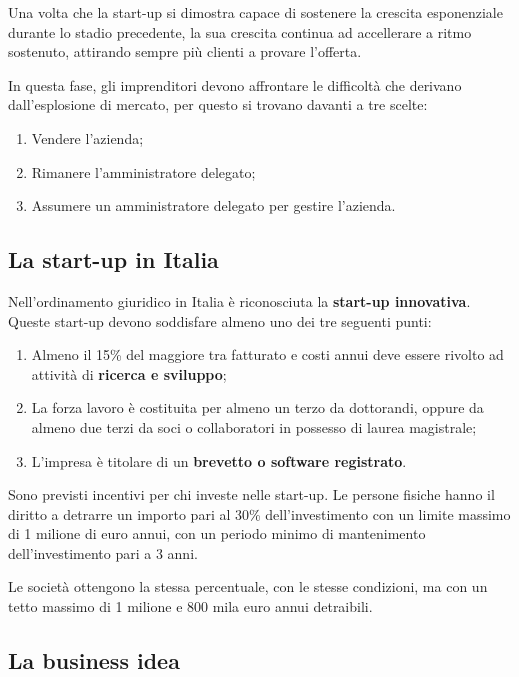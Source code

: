 \documentclass[14pt]{extarticle}
\begin{document}
Una volta che la start-up si dimostra capace di sostenere la crescita
esponenziale durante lo stadio precedente, la sua crescita continua ad
accellerare a ritmo sostenuto, attirando sempre più clienti a provare l'offerta.

In questa fase, gli imprenditori devono affrontare le difficoltà che derivano
dall'esplosione di mercato, per questo si trovano davanti a tre scelte:

\begin{enumerate}
    \item Vendere l'azienda;
    \item Rimanere l'amministratore delegato;
    \item Assumere un amministratore delegato per gestire l'azienda. 
\end{enumerate}

\subsection{La start-up in Italia}

Nell'ordinamento giuridico in Italia è riconosciuta la \textbf{start-up
innovativa}. Queste start-up devono soddisfare almeno uno dei tre seguenti
punti:

\begin{enumerate}
    \item Almeno il 15\% del maggiore tra fatturato e costi annui deve essere
    rivolto ad attività di \textbf{ricerca e sviluppo};
    \item La forza lavoro è costituita per almeno un terzo da dottorandi, oppure
    da almeno due terzi da soci o collaboratori in possesso di laurea
    magistrale;
    \item L'impresa è titolare di un \textbf{brevetto o software registrato}.  
\end{enumerate}
Sono previsti incentivi per chi investe nelle start-up. Le persone fisiche hanno
il diritto a detrarre un importo pari al 30\% dell'investimento con un limite
massimo di 1 milione di euro annui, con un periodo minimo di mantenimento
dell'investimento pari a 3 anni.

Le società ottengono la stessa percentuale, con le stesse condizioni, ma con un
tetto massimo di 1 milione e 800 mila euro annui detraibili.

\subsection{La business idea}
\end{document}
